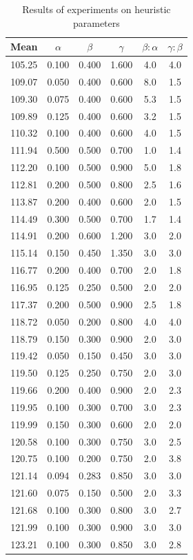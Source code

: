 \documentclass[letterpaper]{article}
\begin{document}
\begin{table}
\caption{Results of experiments on heuristic parameters}
\label{tbl:heuristicParameterResults}
\centering
\begin{tabular}{c c c c c c}
\hline
Mean & $\alpha$ & $\beta$ & $\gamma$ & $\beta : \alpha$ & $\gamma : \beta$\\
\hline
105.25 & 0.100 & 0.400 & 1.600 & 4.0 & 4.0 \\
109.07 & 0.050 & 0.400 & 0.600 & 8.0 & 1.5 \\
109.30 & 0.075 & 0.400 & 0.600 & 5.3 & 1.5 \\
\hline
109.89 & 0.125 & 0.400 & 0.600 & 3.2 & 1.5 \\
110.32 & 0.100 & 0.400 & 0.600 & 4.0 & 1.5 \\
111.94 & 0.500 & 0.500 & 0.700 & 1.0 & 1.4 \\
\hline
112.20 & 0.100 & 0.500 & 0.900 & 5.0 & 1.8 \\
112.81 & 0.200 & 0.500 & 0.800 & 2.5 & 1.6 \\
113.87 & 0.200 & 0.400 & 0.600 & 2.0 & 1.5 \\
\hline
114.49 & 0.300 & 0.500 & 0.700 & 1.7 & 1.4 \\
114.91 & 0.200 & 0.600 & 1.200 & 3.0 & 2.0 \\
115.14 & 0.150 & 0.450 & 1.350 & 3.0 & 3.0 \\
\hline
116.77 & 0.200 & 0.400 & 0.700 & 2.0 & 1.8 \\
116.95 & 0.125 & 0.250 & 0.500 & 2.0 & 2.0 \\
117.37 & 0.200 & 0.500 & 0.900 & 2.5 & 1.8 \\
\hline
118.72 & 0.050 & 0.200 & 0.800 & 4.0 & 4.0 \\
118.79 & 0.150 & 0.300 & 0.900 & 2.0 & 3.0 \\
119.42 & 0.050 & 0.150 & 0.450 & 3.0 & 3.0 \\
\hline
119.50 & 0.125 & 0.250 & 0.750 & 2.0 & 3.0 \\
119.66 & 0.200 & 0.400 & 0.900 & 2.0 & 2.3 \\
119.95 & 0.100 & 0.300 & 0.700 & 3.0 & 2.3 \\
\hline
119.99 & 0.150 & 0.300 & 0.600 & 2.0 & 2.0 \\
120.58 & 0.100 & 0.300 & 0.750 & 3.0 & 2.5 \\
120.75 & 0.100 & 0.200 & 0.750 & 2.0 & 3.8 \\
\hline
121.14 & 0.094 & 0.283 & 0.850 & 3.0 & 3.0 \\
121.60 & 0.075 & 0.150 & 0.500 & 2.0 & 3.3 \\
121.68 & 0.100 & 0.300 & 0.800 & 3.0 & 2.7 \\
\hline
121.99 & 0.100 & 0.300 & 0.900 & 3.0 & 3.0 \\
123.21 & 0.100 & 0.300 & 0.850 & 3.0 & 2.8 \\
\hline
\end{tabular}
\end{table}
\end{document}
